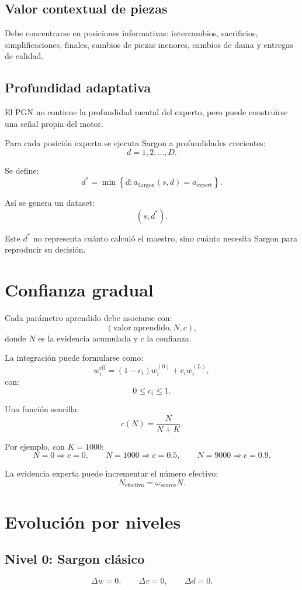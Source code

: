 \documentclass[11pt,a4paper]{article}
\begin{document}
\subsection*{Valor contextual de piezas}
Debe concentrarse en posiciones informativas: intercambios, sacrificios, simplificaciones, finales, cambios de piezas menores, cambios de dama y entregas de calidad.

\subsection*{Profundidad adaptativa}
El PGN no contiene la profundidad mental del experto, pero puede construirse una señal propia del motor.

Para cada posición experta se ejecuta Sargon a profundidades crecientes:
\[
d=1,2,\ldots,D.
\]

Se define:
\[
d^*
=
\min
\left\{
d:
a_{\text{Sargon}}(s,d)=a_{\text{expert}}
\right\}.
\]

Así se genera un dataset:
\[
(s,d^*).
\]

Este $d^*$ no representa cuánto calculó el maestro, sino cuánto necesita Sargon para reproducir su decisión.

\section{Confianza gradual}
Cada parámetro aprendido debe asociarse con:
\[
(\text{valor aprendido},N,c),
\]
donde $N$ es la evidencia acumulada y $c$ la confianza.

La integración puede formularse como:
\[
w_i^{\text{eff}}
=
(1-c_i)w_i^{(0)}
+
c_iw_i^{(L)},
\]
con:
\[
0\leq c_i\leq1.
\]

Una función sencilla:
\[
c(N)=\frac{N}{N+K}.
\]

Por ejemplo, con $K=1000$:
\[
N=0 \Rightarrow c=0,
\qquad
N=1000 \Rightarrow c=0.5,
\qquad
N=9000 \Rightarrow c=0.9.
\]

La evidencia experta puede incrementar el número efectivo:
\[
N_{\text{efectivo}}
=
\omega_{\text{source}}N.
\]

\section{Evolución por niveles}
\subsection*{Nivel 0: Sargon clásico}
\[
\Delta w=0,\qquad
\Delta v=0,\qquad
\Delta d=0.
\]
\end{document}

